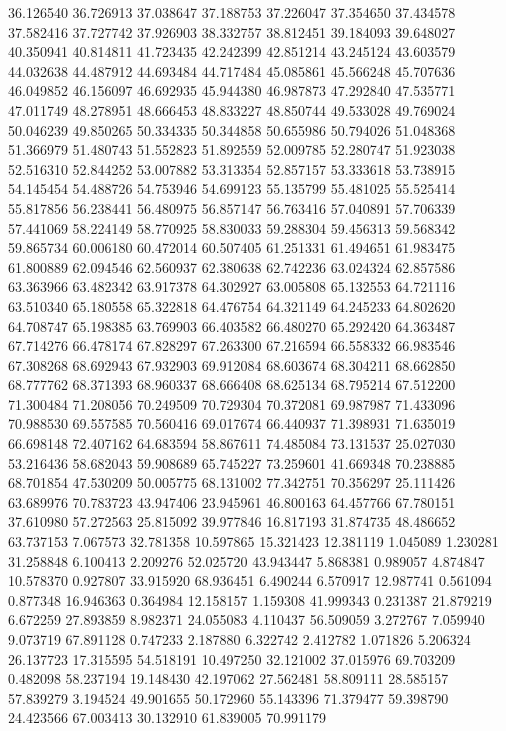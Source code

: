 36.126540
36.726913
37.038647
37.188753
37.226047
37.354650
37.434578
37.582416
37.727742
37.926903
38.332757
38.812451
39.184093
39.648027
40.350941
40.814811
41.723435
42.242399
42.851214
43.245124
43.603579
44.032638
44.487912
44.693484
44.717484
45.085861
45.566248
45.707636
46.049852
46.156097
46.692935
45.944380
46.987873
47.292840
47.535771
47.011749
48.278951
48.666453
48.833227
48.850744
49.533028
49.769024
50.046239
49.850265
50.334335
50.344858
50.655986
50.794026
51.048368
51.366979
51.480743
51.552823
51.892559
52.009785
52.280747
51.923038
52.516310
52.844252
53.007882
53.313354
52.857157
53.333618
53.738915
54.145454
54.488726
54.753946
54.699123
55.135799
55.481025
55.525414
55.817856
56.238441
56.480975
56.857147
56.763416
57.040891
57.706339
57.441069
58.224149
58.770925
58.830033
59.288304
59.456313
59.568342
59.865734
60.006180
60.472014
60.507405
61.251331
61.494651
61.983475
61.800889
62.094546
62.560937
62.380638
62.742236
63.024324
62.857586
63.363966
63.482342
63.917378
64.302927
63.005808
65.132553
64.721116
63.510340
65.180558
65.322818
64.476754
64.321149
64.245233
64.802620
64.708747
65.198385
63.769903
66.403582
66.480270
65.292420
64.363487
67.714276
66.478174
67.828297
67.263300
67.216594
66.558332
66.983546
67.308268
68.692943
67.932903
69.912084
68.603674
68.304211
68.662850
68.777762
68.371393
68.960337
68.666408
68.625134
68.795214
67.512200
71.300484
71.208056
70.249509
70.729304
70.372081
69.987987
71.433096
70.988530
69.557585
70.560416
69.017674
66.440937
71.398931
71.635019
66.698148
72.407162
64.683594
58.867611
74.485084
73.131537
25.027030
53.216436
58.682043
59.908689
65.745227
73.259601
41.669348
70.238885
68.701854
47.530209
50.005775
68.131002
77.342751
70.356297
25.111426
63.689976
70.783723
43.947406
23.945961
46.800163
64.457766
67.780151
37.610980
57.272563
25.815092
39.977846
16.817193
31.874735
48.486652
63.737153
7.067573
32.781358
10.597865
15.321423
12.381119
1.045089
1.230281
31.258848
6.100413
2.209276
52.025720
43.943447
5.868381
0.989057
4.874847
10.578370
0.927807
33.915920
68.936451
6.490244
6.570917
12.987741
0.561094
0.877348
16.946363
0.364984
12.158157
1.159308
41.999343
0.231387
21.879219
6.672259
27.893859
8.982371
24.055083
4.110437
56.509059
3.272767
7.059940
9.073719
67.891128
0.747233
2.187880
6.322742
2.412782
1.071826
5.206324
26.137723
17.315595
54.518191
10.497250
32.121002
37.015976
69.703209
0.482098
58.237194
19.148430
42.197062
27.562481
58.809111
28.585157
57.839279
3.194524
49.901655
50.172960
55.143396
71.379477
59.398790
24.423566
67.003413
30.132910
61.839005
70.991179
